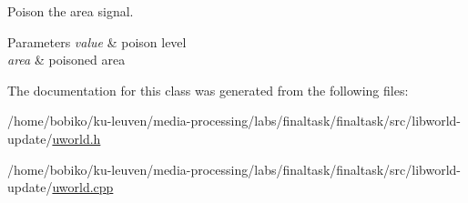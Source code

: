 Poison the area signal. 


\begin{DoxyParams}{Parameters}
{\em value} & poison level \\
\hline
{\em area} & poisoned area \\
\hline
\end{DoxyParams}


The documentation for this class was generated from the following files\+:\begin{DoxyCompactItemize}
\item 
/home/bobiko/ku-\/leuven/media-\/processing/labs/finaltask/finaltask/src/libworld-\/update/\hyperlink{uworld_8h}{uworld.\+h}\item 
/home/bobiko/ku-\/leuven/media-\/processing/labs/finaltask/finaltask/src/libworld-\/update/\hyperlink{uworld_8cpp}{uworld.\+cpp}\end{DoxyCompactItemize}
